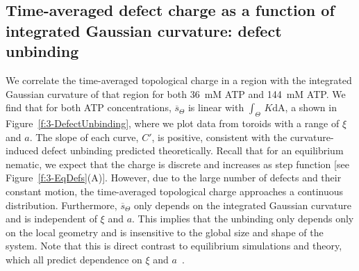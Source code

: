 \subsection{Time-averaged defect charge as a function of integrated Gaussian curvature: defect unbinding}
We correlate the time-averaged topological charge in a region with the integrated Gaussian curvature of that region for both 36~mM ATP and 144~mM ATP.
We find that for both ATP concentrations, $\overbar{s}_{\Theta}$ is linear with $\int_{\Theta}\,K\textrm{dA}$, a shown in Figure~\ref{f:3-DefectUnbinding}, where we plot data from toroids with a range of $\xi$ and $a$.
The slope of each curve, $C'$, is positive, consistent with the curvature-induced defect unbinding predicted theoretically.
Recall that for an equilibrium nematic, we expect that the charge is discrete and increases as step function [see Figure~\ref{f:3-EqDefs}(A)].
However, due to the large number of defects and their constant motion, the time-averaged topological charge approaches a continuous distribution.
Furthermore, $\overbar{s}_{\Theta}$ only depends on the integrated Gaussian curvature and is independent of $\xi$ and $a$.
This implies that the unbinding only depends only on the local geometry and is insensitive to the  global size and shape of the system.
Note that this is direct contrast to equilibrium simulations and theory, which all predict dependence on $\xi$ and $a$~\cite{RN36,RN19,RN22,RN20,RN78}.

